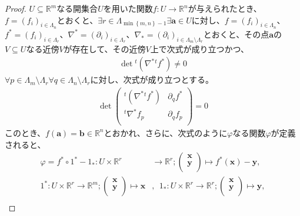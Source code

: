 \documentclass[dvipdfmx]{jsarticle}
\begin{document}
\begin{proof}
$U \subseteq \mathbb{R}^{m}$なる開集合$U$を用いた関数$f:U \rightarrow \mathbb{R}^{n}$が与えられたとき、$f = \left( f_{i} \right)_{i \in \varLambda_{n}}$とおくと、$\exists r \in \varLambda_{\min\left\{ m,n \right\} - 1}\exists\mathbf{a} \in U$に対し、$f = \left( f_{i} \right)_{i \in \varLambda_{n}}$、$f^{*} = \left( f_{i} \right)_{i \in \varLambda_{r}}$、$\nabla^{*} = \left( \partial_{i} \right)_{i \in \varLambda_{r}}$、$\nabla_{*} = \left( \partial_{i} \right)_{i \in \varLambda_{m} \setminus \varLambda_{r}}$とおくと、その点$\mathbf{a}$の$V \subseteq U$なる近傍$V$が存在して、その近傍$V$上で次式が成り立つかつ、
\begin{align*}
\det{{}^{t}\left( \nabla^{*}{}^{t}f^{*} \right)} \neq 0
\end{align*}
$\forall p \in \varLambda_{m} \setminus \varLambda_{r}\forall q \in \varLambda_{n} \setminus \varLambda_{r}$に対し、次式が成り立つとする。
\begin{align*}
\det\begin{pmatrix}
{}^{t}\left( \nabla^{*}{}^{t}f^{*} \right) & \partial_{q}f^{*} \\
{}^{t}\nabla^{*}f_{p} & \partial_{q}f_{p} \\
\end{pmatrix} = 0
\end{align*}
このとき、$f\left( \mathbf{a} \right) = \mathbf{b} \in \mathbb{R}^{n}$とおかれ、さらに、次式のように$\varphi $なる関数$\varphi$が定義されると、
\begin{align*}
\varphi = f^{*} \circ 1^{*} - 1_{*} :U \times \mathbb{R}^{r} &\rightarrow \mathbb{R}^{r};\begin{pmatrix} 
\mathbf{x} \\
\mathbf{y} \\
\end{pmatrix} \mapsto f^{*}\left( \mathbf{x} \right) - \mathbf{y}, \\
1^{*} :U \times \mathbb{R}^{r} \rightarrow \mathbb{R}^{m};\begin{pmatrix} 
  \mathbf{x} \\
  \mathbf{y} \\
\end{pmatrix} \mapsto \mathbf{x} &,\ \ 1_{*} :U \times \mathbb{R}^{r} \rightarrow \mathbb{R}^{r};\begin{pmatrix} 
  \mathbf{x} \\
  \mathbf{y} \\
\end{pmatrix} \mapsto \mathbf{y} ,\\

\end{align*}
\end{proof}
\end{document}
